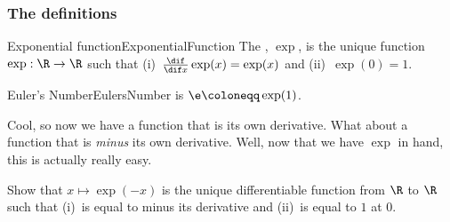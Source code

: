 \subsubsection{The definitions}

\begin{dfn}{Exponential function}{ExponentialFunction}
The , $\exp$\index[notation]{$\exp$}, is the unique function $\exp :\R \rightarrow \R$ such that (i)~$\frac{\dif}{\dif x}\exp (x)=\exp (x)$ and (ii)~$\exp (0)=1$.
\end{dfn}
\begin{dfn}{Euler's Number}{EulersNumber}
 is $\e \coloneqq \exp (1)$\index[notation]{$\e$}.
\end{dfn}

Cool, so now we have a function that is its own derivative.  What about a function that is \emph{minus} its own derivative.  Well, now that we have $\exp$ in hand, this is actually really easy.
\begin{exr}{}{}
Show that $x\mapsto \exp (-x)$ is the unique differentiable function from $\R$ to $\R$ such that (i)~is equal to minus its derivative and (ii)~is equal to $1$ at $0$.
\end{exr}

